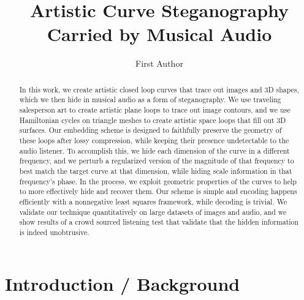 \documentclass[runningheads]{llncs}
\begin{document}
%
\title{Artistic Curve Steganography Carried by Musical Audio}
%
%
\author{First Author}
%
%
%
\maketitle              %
%
\begin{abstract}

  In this work, we create artistic closed loop curves that trace out images and 3D shapes, which we then hide in musical audio as a form of steganography.  We use traveling salesperson art to create artistic plane loops to trace out image contours, and we use Hamiltonian cycles on triangle meshes to create artistic space loops that fill out 3D surfaces. Our embedding scheme is designed to faithfully preserve the geometry of these loops after lossy compression, while keeping their presence undetectable to the audio listener. To accomplish this, we hide each dimension of the curve in a different frequency, and we perturb a regularized version of the magnitude of that frequency to best match the target curve at that dimension, while hiding scale information in that frequency's phase.  In the process, we exploit geometric properties of the curves to help to more effectively hide and recover them.  Our scheme is simple and encoding happens efficiently with a nonnegative least squares framework, while decoding is trivial.  We validate our technique quantitatively on large datasets of images and audio, and we show results of a crowd sourced listening test that validate that the hidden information is indeed unobtrusive.



  

\end{abstract}
%
%
%
\section{Introduction / Background}
\end{document}
